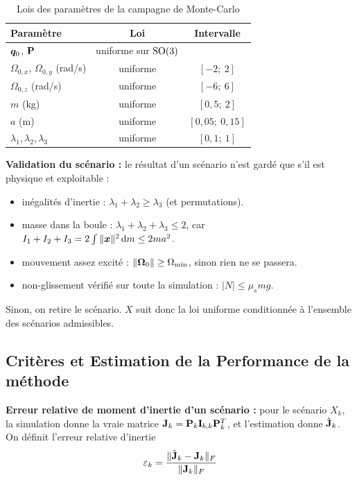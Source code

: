 \begin{table}[H]
    \centering
    \begin{tabular}{lcc}
        \toprule
        Paramètre & Loi & Intervalle \\
        \midrule
        $\bm{q}_0$, $\mathbf{P}$ & uniforme sur $\mathrm{SO}(3)$ & \\
        $\Omega_{0,x}$, $\Omega_{0,y}$ (rad/s) & uniforme & $[-2;\ 2]$ \\
        $\Omega_{0,z}$ (rad/s) & uniforme & $[-6;\ 6]$ \\
        $m$ (kg) & uniforme & $[0{,}5;\ 2]$ \\
        $a$ (m) & uniforme & $[0{,}05;\ 0{,}15]$ \\
        $\lambda_1, \lambda_2, \lambda_3$ & uniforme & $[0{,}1;\ 1]$ \\
        \bottomrule
    \end{tabular}
    \caption{Lois des paramètres de la campagne de Monte-Carlo}
    \label{tab-lois-mc}
\end{table}
\textbf{Validation du scénario : } le résultat d'un scénario n'est gardé que s'il est
physique et exploitable :
\begin{itemize}
    \item inégalités d'inertie : $\lambda_1 + \lambda_2 \ge \lambda_3$ (et
    permutations).

    \item masse dans la boule : $\lambda_1 + \lambda_2 + \lambda_3 \le 2$,
    car $I_1 + I_2 + I_3 = 2\int \|\bm{x}\|^2\,\mathrm{d}m \le 2ma^2$.
    \item mouvement assez excité : $\|\bm{\Omega}_0\| \ge \Omega_{\min}$,
    sinon rien ne se passera.
    \item non-glissement vérifié sur toute la simulation : $|N| \le \mu_s m g$.
\end{itemize}
Sinon, on retire le scénario. $X$ suit donc la loi uniforme conditionnée
à l'ensemble des scénarios admissibles.

\subsection{Critères et Estimation de la Performance de la méthode}

\textbf{Erreur relative de moment d'inertie d'un scénario : } pour le scénario $X_k$, la simulation
donne la vraie matrice $\mathbf{J}_k = \mathbf{P}_k\mathbf{I}_{b,k}\mathbf{P}_k^T$, et
l'estimation donne $\hat{\mathbf{J}}_k$. On définit l'erreur relative d'inertie
\[
    \varepsilon_k = \frac{\|\hat{\mathbf{J}}_k - \mathbf{J}_k\|_F}{\|\mathbf{J}_k\|_F}
\]

